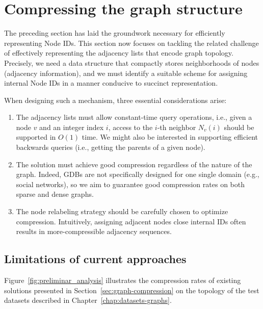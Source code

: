 \section{Compressing the graph structure}

The preceding section has laid the groundwork necessary for efficiently representing Node IDs. This section now focuses on tackling the related challenge of effectively representing the adjacency lists that encode graph topology. Precisely, we need a data structure that compactly stores neighborhoods of nodes (adjacency information), and we must identify a suitable scheme for assigning internal Node IDs in a manner conducive to succinct representation.

When designing such a mechanism, three essential considerations arise:

\begin{enumerate}
    \item The adjacency lists must allow constant-time query operations, i.e., given a node \(v\) and an integer index \(i\), access to the $i$-th neighbor $N_v(i)$ should be supported in $O(1)$ time. We might also be interested in supporting efficient backwards queries (i.e., getting the parents of a given node).
    \item The solution must achieve good compression regardless of the nature of the graph. Indeed, GDBs are not specifically designed for one single domain (e.g., social networks), so we aim to guarantee good compression rates on both sparse and dense graphs.
    \item The node relabeling strategy should be carefully chosen to optimize compression. Intuitively, assigning adjacent nodes close internal IDs often results in more-compressible adjacency sequences.
\end{enumerate}

\subsection{Limitations of current approaches}

Figure~\ref{fig:preliminar_analysis} illustrates the compression rates of existing solutions presented in Section~\ref{sec:graph-compression} on the topology of the test datasets described in Chapter~\ref{chap:datasets-graphs}.


